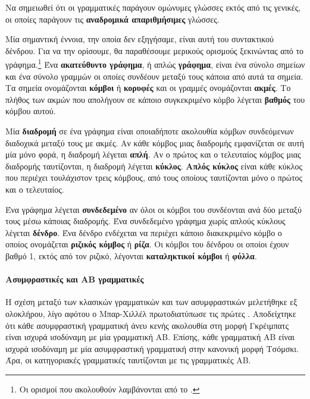 \documentclass [a4paper,11pt] {book}
\theoremstyle{definition}
\theoremstyle{definition}
\begin{document}
Να σημειωθεί ότι οι γραμματικές παράγουν ομώνυμες γλώσσες εκτός από τις γενικές, οι οποίες παράγουν τις \textbf{αναδρομικά απαριθμήσιμες} γλώσσες.

Μία σημαντική έννοια, την οποία δεν εξηγήσαμε, είναι αυτή του συντακτικού δένδρου. Για να την ορίσουμε, θα παραθέσουμε μερικούς ορισμούς ξεκινώντας από το γράφημα.\footnote{Οι ορισμοί που ακολουθούν λαμβάνονται από το \citep{sipser}.} Ένα \textbf{ακατεύθυντο γράφημα}, ή απλώς \textbf{γράφημα}, είναι ένα σύνολο σημείων και ένα σύνολο γραμμών οι οποίες συνδέουν μεταξύ τους κάποια από αυτά τα σημεία. Τα σημεία ονομάζονται \textbf{κόμβοι} ή \textbf{κορυφές} και οι γραμμές ονομάζονται \textbf{ακμές}. Το πλήθος των ακμών που απολήγουν σε κάποιο συγκεκριμένο κόμβο λέγεται \textbf{βαθμός} του κόμβου αυτού.

Μία \textbf{διαδρομή} σε ένα γράφημα είναι οποιαδήποτε ακολουθία κόμβων συνδεόμενων διαδοχικά μεταξύ τους με ακμές. Αν κάθε κόμβος μιας διαδρομής εμφανίζεται σε αυτή μία μόνο φορά, η διαδρομή λέγεται \textbf{απλή}. Αν ο πρώτος και ο τελευταίος κόμβος μιας διαδρομής ταυτίζονται, η διαδρομή λέγεται \textbf{κύκλος}. \textbf{Απλός κύκλος} είναι κάθε κύκλος που περιέχει τουλάχιστον τρεις κόμβους, από τους οποίους ταυτίζονται μόνο ο πρώτος και ο τελευταίος. 

Ένα γράφημα λέγεται \textbf{συνδεδεμένο} αν όλοι οι κόμβοι του συνδέονται ανά δύο μεταξύ τους μέσω κάποιας διαδρομής. Ένα συνδεδεμένο γράφημα χωρίς απλούς κύκλους λέγεται \textbf{δένδρο}. Ένα δένδρο ενδέχεται να περιέχει κάποιο διακεκριμένο κόμβο ο οποίος ονομάζεται \textbf{ριζικός κόμβος} ή \textbf{ρίζα}. Οι κόμβοι του δένδρου οι οποίοι έχουν βαθμό 1, εκτός από τον ριζικό, λέγονται \textbf{καταληκτικοί κόμβοι} ή \textbf{φύλλα}.

\paragraph{Ασυμφραστικές και ΑΒ γραμματικές}
Η σχέση μεταξύ των κλασικών γραμματικών και των ασυμφραστικών μελετήθηκε εξ ολοκλήρου, λίγο αφότου ο Μπαρ-Χιλλέλ πρωτοδιατύπωσε τις πρώτες \citep{BGS63}. Αποδείχτηκε ότι κάθε ασυμφραστική γραμματική άνευ κενής ακολουθία στη μορφή Γκρέιμπατς είναι ισχυρά ισοδύναμη με μία γραμματική ΑΒ. Επίσης, κάθε γραμματική ΑΒ είναι ισχυρά ισοδύναμη με μία ασυμφραστική γραμματική στην κανονική μορφή Τσόμσκι. Άρα, οι κατηγοριακές γραμματικές ταυτίζονται με τις γραμματικές ΑΒ.
\end{document}
